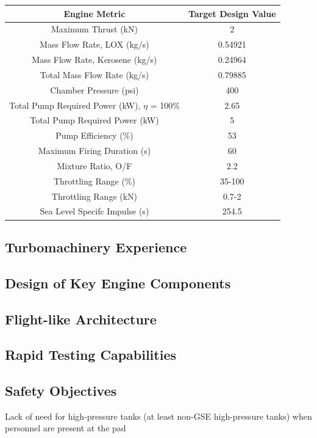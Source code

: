 \documentclass[12pt, letterpaper]{article}
\begin{document}
\begin{tabular}{|c|c|}

\hline

Engine Metric & Target Design Value \\

\hline

Maximum Thrust (kN) & 2 \\
Mass Flow Rate, LOX (kg/s) & 0.54921 \\
Mass Flow Rate, Kerosene (kg/s) & 0.24964 \\
Total Mass Flow Rate (kg/s) & 0.79885 \\
Chamber Pressure (psi) & 400 \\
Total Pump Required Power  (kW), $\eta$ = 100\% & 2.65 \\
Total Pump Required Power (kW) & 5 \\
Pump Efficiency (\%) & 53 \\
Maximum Firing Duration (s) & 60 \\
Mixture Ratio, O/F & 2.2 \\
Throttling Range (\%) & 35-100 \\
Throttling Range (kN)& 0.7-2 \\
Sea Level Specifc Impulse (s) & 254.5 \\

\hline

\end{tabular}

\subsection{Turbomachinery Experience}
\subsection{Design of Key Engine Components}
\subsection{Flight-like Architecture}
\subsection{Rapid Testing Capabilities}
\subsection{Safety Objectives}
Lack of need for high-pressure tanks (at least non-GSE high-pressure tanks) when personnel are present at the pad
\end{document}
